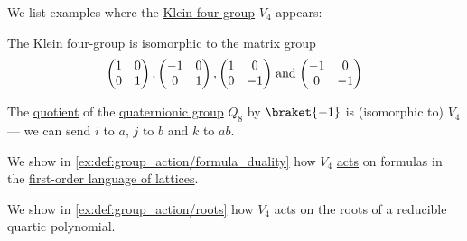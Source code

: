 \begin{example}\label{ex:def:klein_four_group}
  We list examples where the \hyperref[def:klein_four_group]{Klein four-group} \( V_4 \) appears:
  \begin{thmenum}
     The Klein four-group is isomorphic to the matrix group
    \begin{equation}\label{eq:ex:def:klein_four_group/2x2_matrices}
      \begin{pmatrix}
        1 & 0 \\
        0 & 1
      \end{pmatrix}
      ,
      \begin{pmatrix}
        -1 & 0 \\
        0  & 1
      \end{pmatrix}
      ,
      \begin{pmatrix}
        1 & 0 \\
        0 & -1
      \end{pmatrix}
      \T{and}
      \begin{pmatrix}
        -1 & 0 \\
        0  & -1
      \end{pmatrix}
    \end{equation}

     The \hyperref[def:group/quotient]{quotient} of the \hyperref[def:quaternionic_group]{quaternionic group} \( Q_8 \) by \( \braket{ -1 } \) is (isomorphic to) \( V_4 \) --- we can send \( i \) to \( a \), \( j \) to \( b \) and \( k \) to \( ab \).

     We show in \cref{ex:def:group_action/formula_duality} how \( V_4 \) \hyperref[def:group_action]{acts} on formulas in the \hyperref[def:lattice/theory]{first-order language of lattices}.

     We show in \cref{ex:def:group_action/roots} how \( V_4 \) acts on the roots of a reducible quartic polynomial.
  \end{thmenum}
\end{example}
